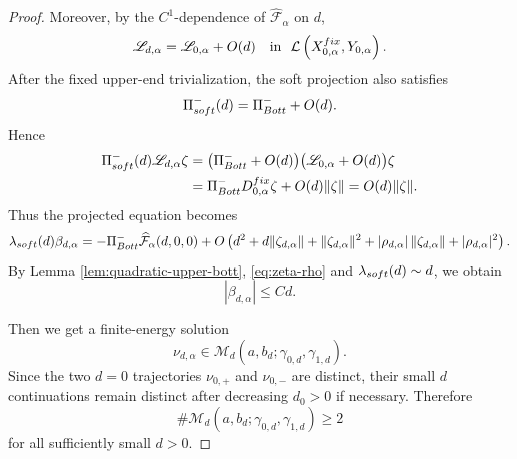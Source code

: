 \documentclass[10pt,a4paper]{amsart}
\begin{document}
\begin{proof}
Moreover, by the $C^1$-dependence of
$\widehat{\mathcal F}_\alpha$ on $d$,
\[
\mathscr L_{d,\alpha}
=\mathscr L_{0,\alpha}+O(d)\quad\text{in }~\mathcal L
\left(X^{\rm fix}_{0,\alpha},Y_{0,\alpha}\right).
\]
After the fixed upper-end trivialization, the soft projection also
satisfies
\[
\Pi_{\rm soft}^-(d)=\Pi_{\rm Bott}^-+O(d).
\]
Hence
\[
\begin{aligned}
\Pi_{\rm soft}^-(d)\mathscr L_{d,\alpha}\zeta
&=\bigl(\Pi_{\rm Bott}^-+O(d)\bigr)
\bigl(\mathscr L_{0,\alpha}+O(d)\bigr)\zeta \\
&=\Pi_{\rm Bott}^-D_{0,\alpha}^{\rm fix}\zeta
+O(d)\|\zeta\|=O(d)\|\zeta\|.
\end{aligned}
\]
Thus the projected equation becomes
\[
\lambda_{\rm soft}(d)\beta_{d,\alpha}
=-\Pi_{\rm Bott}^-\widehat{\mathcal F}_{\alpha}(d,0,0)+O\left(d^2+d\|\zeta_{d,\alpha}\|
+\|\zeta_{d,\alpha}\|^2+|\rho_{d,\alpha}|\,\|\zeta_{d,\alpha}\|+|\rho_{d,\alpha}|^2\right).
\]
By Lemma \ref{lem:quadratic-upper-bott}, \eqref{eq:zeta-rho} and $\lambda_{\rm soft}(d)\sim d$, we obtain
\[
|\beta_{d,\alpha}|\le Cd.
\]

Then we get a finite-energy solution
\[
\nu_{d,\alpha}\in
\mathcal M_d(a,b_d;\gamma_{0,d},\gamma_{1,d}).
\]
Since the two $d=0$ trajectories $\nu_{0,+}$ and $\nu_{0,-}$ are
distinct, their small $d$ continuations remain distinct after
decreasing $d_0>0$ if necessary.  Therefore
\[
\#\mathcal M_d(a,b_d;\gamma_{0,d},\gamma_{1,d})\ge2
\]
for all sufficiently small $d>0$.    
\end{proof}
\end{document}
